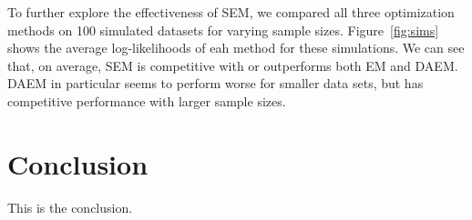 \documentclass{article}
\theoremstyle{definition}
\theoremstyle{algodesc}
\begin{document}
To further explore the effectiveness of SEM, we compared all three optimization methods on 100 simulated datasets for varying sample sizes. Figure~\ref{fig:sims} shows the average log-likelihoods of eah method for these simulations. We can see that, on average, SEM is competitive with or outperforms both EM and DAEM. DAEM in particular seems to perform worse for smaller data sets, but has competitive performance with larger sample sizes.


\section{Conclusion} \label{sec:conclusion}

This is the conclusion.




\end{document}
